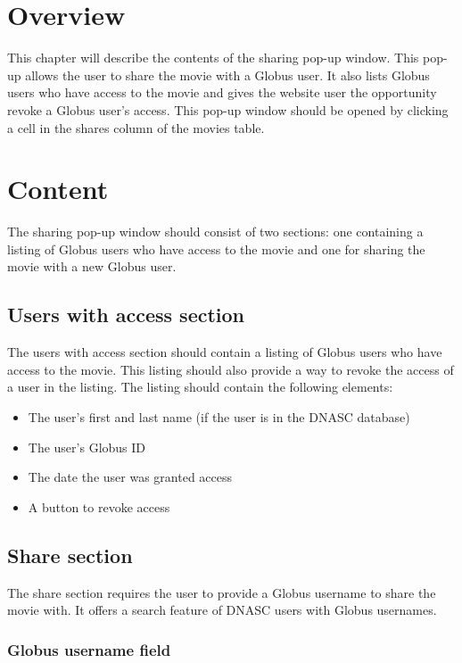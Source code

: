 
\section{Overview}

This chapter will describe the contents of the sharing pop-up window. This pop-up allows 
the user to share the movie with a Globus user. It also lists Globus users who 
have access to the movie and gives the website user the opportunity revoke a 
Globus user's access. This pop-up window should be opened by clicking a cell in 
the shares column of the movies table.

\section{Content}

The sharing pop-up window should consist of two sections: one containing a listing of
Globus users who have access to the movie and one for sharing the movie with a new
Globus user. 

\subsection{Users with access section}

The users with access section should contain a listing of Globus users who have access 
to the movie. This listing should also provide a way to revoke the access of a user in the
listing. The listing should contain the following elements:

\begin{itemize}\itemsep1pt
    \item The user's first and last name (if the user is in the DNASC database)
    \item The user's Globus ID
    \item The date the user was granted access
    \item A button to revoke access
\end{itemize}

\subsection{Share section}

The share section requires the user to provide a Globus username to share the movie with.
It offers a search feature of DNASC users with Globus usernames.

\subsubsection{Globus username field}

